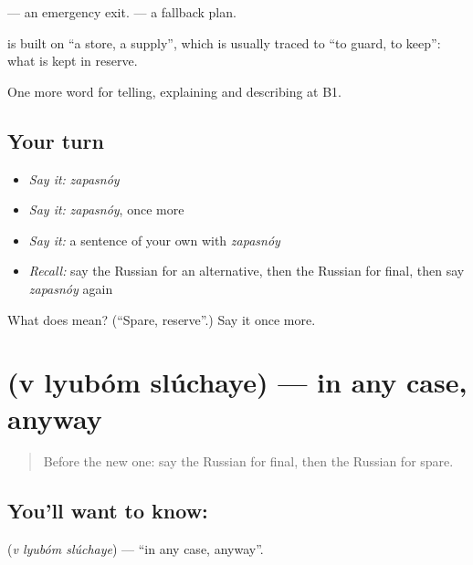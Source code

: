 \emph{ } — an emergency exit. \emph{ } — a fallback plan.

\begin{cousinweb}
\textbf{} is built on \emph{} \textquotedblleft{}a store, a supply\textquotedblright{}, which is usually traced to \emph{} \textquotedblleft{}to guard, to keep\textquotedblright{}: what is kept in reserve.
\end{cousinweb}

\begin{grammarlens}[title={What you've built}]
One more word for telling, explaining and describing at B1.
\end{grammarlens}

\subsection*{Your turn}
\begin{itemize}
\raggedright
  \item \emph{Say it:} \emph{zapasnóy}
  \item \emph{Say it:} \emph{zapasnóy}, once more
  \item \emph{Say it:} a sentence of your own with \emph{zapasnóy}
  \item \emph{Recall:} say the Russian for an alternative, then the Russian for final, then say \emph{zapasnóy} again
\end{itemize}

\begin{tcolorbox}[breakable,colback=teal!4,colframe=teal!35!black,title={Before you move on}]
What does  mean? (\textquotedblleft{}Spare, reserve\textquotedblright{}.) Say it once more.
\end{tcolorbox}
\section[\texorpdfstring{\ru{в} \ru{любом} \ru{случае} (v lyubóm slúchaye)}{в любом случае (v lyubóm slúchaye)}]{   (v lyubóm slúchaye) — in any case, anyway}

\label{lesson:RU-C379-v-lyubom-sluchae}



\begin{quote}
Before the new one: say the Russian for final, then the Russian for spare.
\end{quote}

\subsection*{You'll want to know:   }
\textbf{  } (\emph{v lyubóm slúchaye}) — \textquotedblleft{}in any case, anyway\textquotedblright{}.

